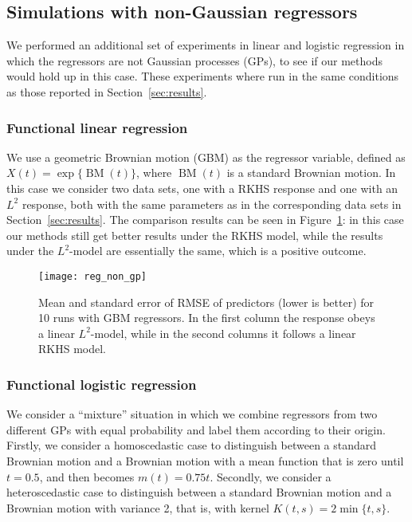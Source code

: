 \subsection{Simulations with non-Gaussian regressors}\label{app:non-gp}

We performed an additional set of experiments in linear and logistic regression in which the regressors are not Gaussian processes (GPs), to see if our methods would hold up in this case. These experiments where run in the same conditions as those reported in Section~\ref{sec:results}.

\subsubsection*{Functional linear regression}

We use a geometric Brownian motion (GBM) as the regressor variable, defined as \(X(t)=\exp\{{\operatorname{BM}(t)}\}\), where \(\operatorname{BM}(t)\) is a standard Brownian motion. In this case we consider two data sets, one with a RKHS response and one with an \(L^2\) response, both with the same parameters as in the corresponding data sets in Section~\ref{sec:results}. The comparison results can be seen in Figure~\ref{fig:reg_non_gp}: in this case our methods still get better results under the RKHS model, while the results under the \(L^2\)-model are essentially the same, which is a positive outcome.

\begin{figure}[ht!]
  \centering
  \texttt{[image: reg\_non\_gp]}
  \caption{Mean and standard error of RMSE of predictors (lower is better) for 10 runs with GBM regressors. In the first column the response obeys a linear \(L^2\)-model, while in the second columns it follows a linear RKHS model.}\label{fig:reg_non_gp}
\end{figure}

\subsubsection*{Functional logistic regression}

We consider a ``mixture'' situation in which we combine regressors from two different GPs with equal probability and label them according to their origin. Firstly, we consider a homoscedastic case to distinguish between a standard Brownian motion and a Brownian motion with a mean function that is zero until \(t=0.5\), and then becomes \(m(t)=0.75t\). Secondly, we consider a heteroscedastic case to distinguish between a standard Brownian motion and a Brownian motion with variance 2, that is, with kernel \(K(t,s)=2\min\{t,s\}\).

